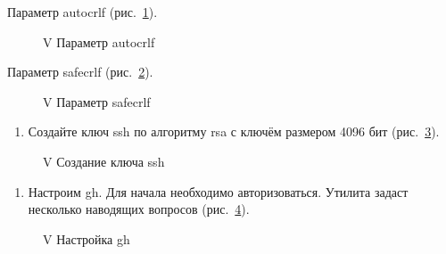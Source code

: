 \documentclass[
  english,
  russian,
  12pt,
  a4paper,
  DIV=11,
  numbers=noendperiod]{scrreprt}
\providecommand{\tightlist}{%
  \setlength{\itemsep}{0pt}\setlength{\parskip}{0pt}}
\begin{document}
Параметр autocrlf (рис.~\ref{fig-006}).

\begin{figure}


\caption{\label{fig-006}V Параметр autocrlf}

\end{figure}%

Параметр safecrlf (рис.~\ref{fig-007}).

\begin{figure}


\caption{\label{fig-007}V Параметр safecrlf}

\end{figure}%

\begin{enumerate}
\def\labelenumi{\arabic{enumi})}
\setcounter{enumi}{3}
\tightlist
\item
  Создайте ключ ssh по алгоритму rsa с ключём размером 4096 бит
  (рис.~\ref{fig-008}).
\end{enumerate}

\begin{figure}


\caption{\label{fig-008}V Создание ключа ssh}

\end{figure}%

\begin{enumerate}
\def\labelenumi{\arabic{enumi})}
\setcounter{enumi}{4}
\tightlist
\item
  Настроим gh. Для начала необходимо авторизоваться. Утилита задаст
  несколько наводящих вопросов (рис.~\ref{fig-009}).
\end{enumerate}

\begin{figure}


\caption{\label{fig-009}V Настройка gh}

\end{figure}%
\end{document}
